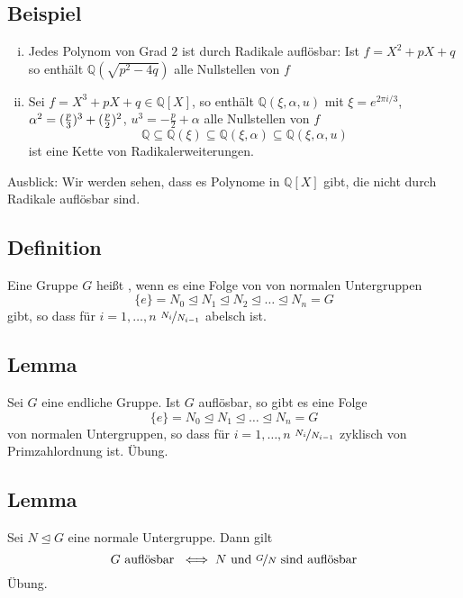 \subsection[Beispiele für durch Radikale auflösbare Polynome]{Beispiel} %
\label{sub:1210}
\begin{enumerate}[(i)]
	\item Jedes Polynom von Grad $2$ ist durch Radikale auflösbar: Ist $f=X^2+ pX +q$ so enthält $\mathds{Q}(\sqrt{p^2- 4q}  )$ alle Nullstellen von $f$
	\item Sei $f = X^3+ pX+q \in \mathds{Q}[X]$, so enthält $\mathds{Q}(\xi, \alpha, u)$ mit $\xi= e^{2 \pi i /3}$, 
	$\alpha^2= (\frac{p}{3} )^3+ (\frac{p}{2} )^2 $, $u^3= -\frac{p}{2}+ \alpha $ alle Nullstellen von $f$
	\[
		\mathds{Q}\subseteq \mathds{Q}(\xi) \subseteq  \mathds{Q}(\xi, \alpha) \subseteq \mathds{Q}(\xi,\alpha,u)
	\] 
	ist eine Kette von Radikalerweiterungen.
\end{enumerate}
Ausblick: Wir werden sehen, dass es Polynome in $\mathds{Q}[X]$ gibt, die nicht durch Radikale auflösbar sind.

\subsection[Definition: auflösbare Gruppe]{Definition} %
\label{sub:1211}
Eine Gruppe $G$ heißt , wenn es eine Folge von von normalen Untergruppen
\[
	\{e\} = N_0 \unlhd N_1 \unlhd N_2 \unlhd \ldots \unlhd N_n = G
\]
gibt, so dass für $i=1, \ldots ,n$ $\nicefrac{N_i}{N_{i-1}}$ abelsch ist.

\subsection[Lemma: Eigenschaft von auflösbaren endlichen Gruppen]{Lemma} %
\label{sub:1212}
Sei $G$ eine endliche Gruppe. Ist $G$ auflösbar, so gibt es eine Folge 
\[
	\{e\} = N_0 \unlhd N_1 \unlhd \ldots \unlhd N_n = G
\]
von normalen Untergruppen, so dass für $i=1,\ldots ,n$ $\nicefrac{N_i}{N_{i-1}}$ zyklisch von Primzahlordnung ist.
Übung.

\subsection[Lemma:Äquivalente Aussage zu $G$ ist auflösbar]{Lemma} %
\label{sub:1213}
Sei $N \unlhd G$ eine normale Untergruppe. Dann gilt
\[
	G \text{ auflösbar } \iff N \text{ und } \nicefrac{G}{N} \text{ sind auflösbar}
\]
Übung.


